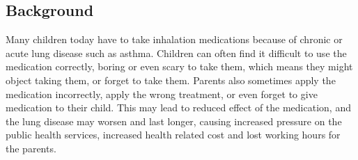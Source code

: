 \subsection{Background}

Many children today have to take inhalation medications because of chronic or
acute lung disease such as asthma. Children can often find it difficult to use
the medication correctly, boring or even scary to take them, which means they
might object taking them, or forget to take them. Parents also sometimes
apply the medication incorrectly, apply the wrong treatment, or even forget to
give medication to their
child. This may lead to reduced effect of the medication, and the lung disease
may worsen and last longer, causing increased pressure on the public health
services, increased health related cost and lost working hours for the parents.


